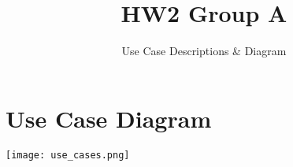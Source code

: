 ﻿\documentclass{article}
\title{HW2 Group A}
\subtitle{Use Case Descriptions \& Diagram}
\newenvironment{al}
{\begin{description}[leftmargin=!,labelwidth=\widthof{\bfseries Preconditions:}]}
{\end{description}}
\newcounter{twocoli}
\newenvironment{twocol}
{ \setcounter{twocoli}{1}
  \begin{tabular}{ p{0.45\textwidth} p{0.43\textwidth}} }
{ \end{tabular} }
\newcommand{\tabrow}[2]
{   \arabic{twocoli}. \  \parbox[t]{0.40\textwidth}{#1 \vspace{0.1 in}} \stepcounter{twocoli} 
  & \arabic{twocoli}. \  \parbox[t]{0.47\textwidth}{#2 \vspace{0.1 in}} \stepcounter{twocoli}\\}
\newcommand{\tableft}[1]
{   \arabic{twocoli}. \  \parbox[t]{0.40\textwidth}{#1 \vspace{0.1 in}} & \parbox[t]{0.47\textwidth}{ \vspace{0.1 in}} \stepcounter{twocoli}\\}
\begin{document}
\section*{Use Case Diagram}
\texttt{[image: use\_cases.png]}

\tableofcontents

\begin{comment}

\section{}
\begin{al}
	\item[Actor:] Player
	\item[Goal:]
	\item[Precondition:]
	\item[Summary:]
\end{al}
\textbf{Steps:} \\
\begin{twocol}
  \tableft{}
  \tabrow{}
         {}
\end{twocol}
\begin{al}
	\item[Alternatives:]
	\begin{enumerate}
	\item
	\item
	\item
	\end{enumerate}
\end{al}

\end{comment}

\begin{comment}


* We have save game but not quit. Is save game related enough to quitting
  to extend or be merged with quitting?

* Should Choose Leader be merged with a general "Select Unit(s)"?

* Some things don't fit nicely into the two-column format. do they need tweaking?

* Should Advance and Retreat extend Movement? Extend Combat?

  Overall I feel like we could have more extending, to make an interesting diagram

* are we missing any big use-cases? Do any need to be tweaked

* tjasz: are only units sacrificed in Human Sacrifice, or should this description
  also account for characters?

Need plan of action to have diagram and associated descriptions ready on thursday

\end{comment}
\end{document}

